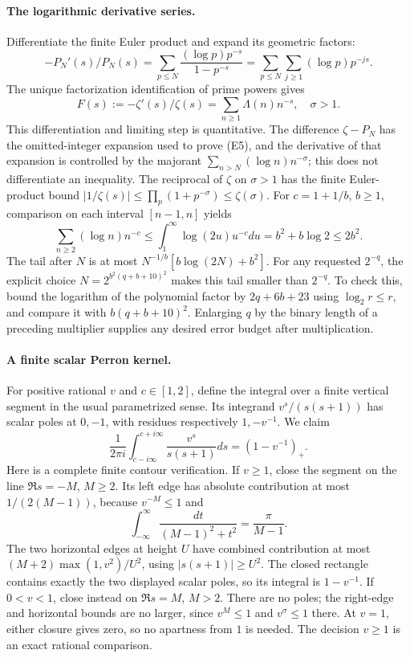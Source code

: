 \paragraph{The logarithmic derivative series.}
Differentiate the finite Euler product and expand its geometric factors:
\[
 -P_N'(s)/P_N(s)
 =\sum_{p\le N}\frac{(\log p)p^{-s}}{1-p^{-s}}
 =\sum_{p\le N}\sum_{j\ge1}(\log p)p^{-js}.
\]
The unique factorization identification of prime powers gives
\[
 F(s):=-\zeta'(s)/\zeta(s)
              =\sum_{n\ge1}\Lambda(n)n^{-s},\quad\sigma>1. \tag{E6}
\]
This differentiation and limiting step is quantitative. The difference
$\zeta-P_N$ has the omitted-integer expansion used to prove (E5), and
the derivative of that expansion is controlled by the majorant
$\sum_{n>N}(\log n)n^{-\sigma}$; this does not differentiate an
inequality. The reciprocal of $\zeta$ on
$\sigma>1$ has the finite Euler-product bound
$|1/\zeta(s)|\le\prod_p(1+p^{-\sigma})\le\zeta(\sigma)$.
For $c=1+1/b$, $b\ge1$, comparison on each interval $[n-1,n]$ yields
\[
 \sum_{n\ge2}(\log n)n^{-c}
 \le\int_1^\infty\log(2u)u^{-c}du
 =b^2+b\log2\le2b^2.                                     \tag{E7}
\]
The tail after $N$ is at most
$N^{-1/b}[b\log(2N)+b^2]$. For any requested $2^{-q}$, the explicit
choice $N=2^{b^2(q+b+10)^2}$ makes this tail smaller than $2^{-q}$.
To check this, bound the logarithm of the polynomial factor by
$2q+6b+23$ using $\log_2r\le r$, and compare it with
$b(q+b+10)^2$. Enlarging $q$ by the binary length of a preceding
multiplier supplies any desired error budget after multiplication.

\paragraph{A finite scalar Perron kernel.}
For positive rational $v$ and $c\in[1,2]$, define the integral over a
finite vertical segment in the usual parametrized sense. Its integrand
$v^s/(s(s+1))$ has scalar poles at $0,-1$, with residues respectively
$1,-v^{-1}$. We claim
\[
 \frac1{2\pi i}\int_{c-i\infty}^{c+i\infty}
            \frac{v^s}{s(s+1)}ds=(1-v^{-1})_+.              \tag{E8}
\]
Here is a complete finite contour verification. If $v\ge1$, close the
segment on the line $\Re s=-M$, $M\ge2$. Its left edge has absolute
contribution at most $1/(2(M-1))$, because $v^{-M}\le1$ and
\[
 \int_{-\infty}^{\infty}
 \frac{dt}{(M-1)^2+t^2}=\frac\pi{M-1}.
\]
The two horizontal edges at height $U$ have combined contribution at
most $(M+2)\max(1,v^2)/U^2$, using $|s(s+1)|\ge U^2$.
The closed rectangle contains exactly the two displayed scalar poles,
so its integral is $1-v^{-1}$. If $0<v<1$, close instead on
$\Re s=M$, $M>2$. There are no poles; the right-edge and horizontal
bounds are no larger, since $v^M\le1$ and $v^\sigma\le1$ there.
At $v=1$, either closure gives zero, so no apartness from $1$ is needed.
The decision $v\ge1$ is an exact rational comparison.

